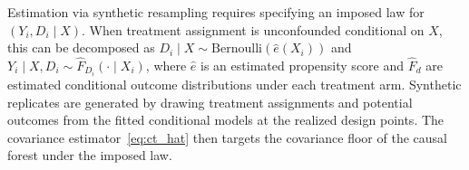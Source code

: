 \documentclass[11pt]{article}
\theoremstyle{plain}
\theoremstyle{definition}
\theoremstyle{remark}
\begin{document}
Estimation via synthetic resampling requires specifying an imposed law for $(Y_i, D_i \mid X)$. When treatment assignment is unconfounded conditional on $X$, this can be decomposed as $D_i \mid X \sim \mathrm{Bernoulli}(\hat e(X_i))$ and $Y_i \mid X, D_i \sim \hat F_{D_i}(\cdot \mid X_i)$, where $\hat e$ is an estimated propensity score and $\hat F_d$ are estimated conditional outcome distributions under each treatment arm. Synthetic replicates are generated by drawing treatment assignments and potential outcomes from the fitted conditional models at the realized design points. The covariance estimator~\eqref{eq:ct_hat} then targets the covariance floor of the causal forest under the imposed law.

	
\end{document}
